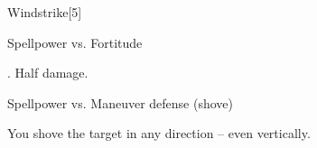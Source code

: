 \begin{spellsection}[Greater]{Windstrike}[5]
    \begin{spellheader}
    \end{spellheader}
    \begin{spellcontent}
        \begin{spelltargetinginfo}
        \end{spelltargetinginfo}
        \begin{spelleffects}
            \begin{spellattack}{Spellpower vs. Fortitude}
                \begin{spellmargin}
                    \spellsuccess {}.
                    \spellfailure Half damage.
                \end{spellmargin}
                \spellatk Spellpower  vs. Maneuver defense (shove)
                \begin{spellmargin}
                    \spellsuccess You shove the target in any direction -- even vertically.
                \end{spellmargin}
            \end{spellattack}
        \end{spelleffects}
    \end{spellcontent}
    \begin{spellfooter}
        \miscastrandom
    \end{spellfooter}
\end{spellsection}

